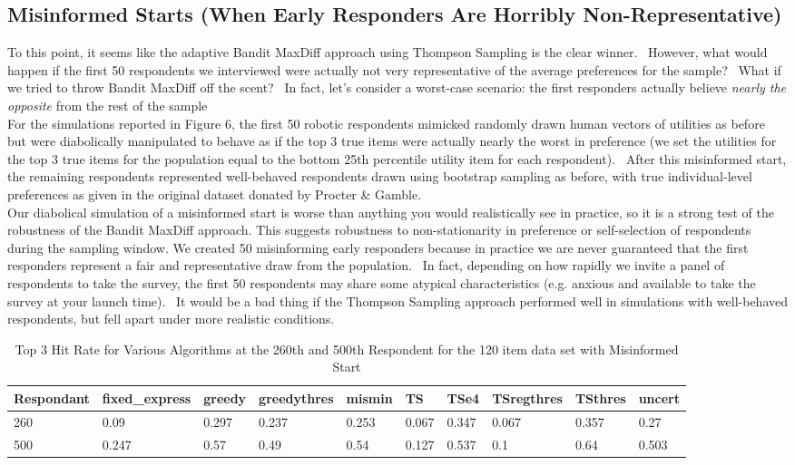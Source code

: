 \documentclass[nonblindrev]{informs3}
\begin{document}
\subsection{Misinformed Starts (When Early Responders Are Horribly Non-Representative)}
To this point, it seems like the adaptive Bandit MaxDiff approach using Thompson Sampling is the clear winner.  However, what would happen if the first 50 respondents we interviewed were actually not very representative of the average preferences for the sample?  What if we tried to throw Bandit MaxDiff off the scent?  In fact, let's consider a worst-case scenario: the first responders actually believe \textit{nearly the opposite} from the rest of the sample\\
For the simulations reported in Figure 6, the first 50 robotic respondents mimicked randomly drawn human vectors of utilities as before but were diabolically manipulated to behave as if the top 3 true items were actually nearly the worst in preference (we set the utilities for the top 3 true items for the population equal to the bottom 25th percentile utility item for each respondent).  After this misinformed start, the remaining respondents represented well-behaved respondents drawn using bootstrap sampling as before, with true individual-level preferences as given in the original dataset donated by Procter \& Gamble.\\
Our diabolical simulation of a misinformed start is worse than anything you would realistically see in practice, so it is a strong test of the robustness of the Bandit MaxDiff approach. This suggests robustness to non-stationarity in preference or self-selection of respondents during the sampling window. We created 50 misinforming early responders because in practice we are never guaranteed that the first responders represent a fair and representative draw from the population.  In fact, depending on how rapidly we invite a panel of respondents to take the survey, the first 50 respondents may share some atypical characteristics (e.g. anxious and available to take the survey at your launch time).  It would be a bad thing if the Thompson Sampling approach performed well in simulations with well-behaved respondents, but fell apart under more realistic conditions. \\
\begin{table}
\begin{center}
\begin{tabular}{llllllllll}
\hline   Respondant &  fixed\_express &  greedy &  greedythres &  mismin &    TS &  TSe4 &  TSregthres &  TSthres &  uncert  \\ \hline    260 &   0.09 &   0.297 &  0.237 &   0.253 & 0.067 & 0.347 &  0.067 &    0.357 &   0.27 \\  500 &  0.247 &   0.57 &  0.49 &   	0.54 & 0.127 & 0.537 &       0.1 &    0.64 &   0.503  \end{tabular}
\end{center}
\caption{Top 3 Hit Rate for Various Algorithms at the 260th and 500th Respondent for the 120 item data set with Misinformed Start}
\label{table:120mis}
\end{table}
\end{document}
